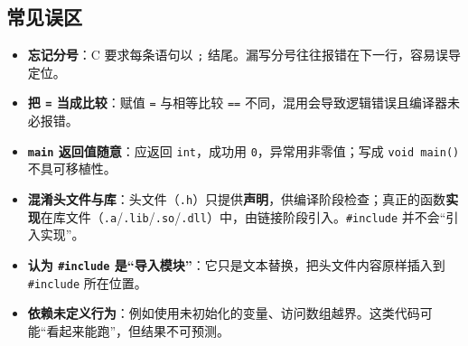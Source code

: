 \subsection{常见误区}

\begin{itemize}
    \item \textbf{忘记分号}：C 要求每条语句以 \texttt{;} 结尾。漏写分号往往报错在下一行，容易误导定位。
    \item \textbf{把 \texttt{=} 当成比较}：赋值 \texttt{=} 与相等比较 \texttt{==} 不同，混用会导致逻辑错误且编译器未必报错。
    \item \textbf{\texttt{main} 返回值随意}：应返回 \texttt{int}，成功用 \texttt{0}，异常用非零值；写成 \texttt{void main()} 不具可移植性。
    \item \textbf{混淆头文件与库}：头文件（\texttt{.h}）只提供\textbf{声明}，供编译阶段检查；真正的函数\textbf{实现}在库文件（\texttt{.a}/\texttt{.lib}/\texttt{.so}/\texttt{.dll}）中，由链接阶段引入。\texttt{\#include} 并不会“引入实现”。
    \item \textbf{认为 \texttt{\#include} 是“导入模块”}：它只是文本替换，把头文件内容原样插入到 \texttt{\#include} 所在位置。
    \item \textbf{依赖未定义行为}：例如使用未初始化的变量、访问数组越界。这类代码可能“看起来能跑”，但结果不可预测。
\end{itemize}

